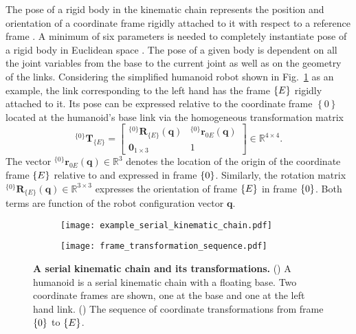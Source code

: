 The pose of a rigid body in the kinematic chain represents the position and orientation of a coordinate frame rigidly attached to it with respect to a reference frame \cite{Siciliano2008RoboticsModellingPlanning}. A minimum of six parameters is needed to completely instantiate pose of a rigid body in Euclidean space \cite{Lynch2017Modernrobotics}. The pose of a given body is dependent on all the joint variables from the base to the current joint as well as on the geometry of the links. Considering the simplified humanoid robot shown in Fig.~\ref{fig:example_serial_kinematic_chain} as an example, the link corresponding to the left hand has the frame ${\left\lbrace E \right\rbrace}$ rigidly attached to it. Its pose can be expressed relative to the coordinate frame $\left\lbrace 0 \right\rbrace$ located at the humanoid's base link via the homogeneous transformation matrix%
\begin{equation}
	^{\{0\}}\bm{T}_{\{E\}} = \begin{bmatrix}
		^{\{0\}}\bm{R}_{\{E\}}(\bm{q}) & ^{\{0\}}\bm{r}_{0E}(\bm{q}) \\
		\bm{0}_{1\times3} & 1
	\end{bmatrix} \in \mathbb{R}^{4\times 4}.
\end{equation}
The vector $^{\{0\}}\bm{r}_{0E}(\bm{q}) \in \mathbb{R}^3$ denotes the location of the origin of the coordinate frame ${\left\lbrace E \right\rbrace}$ relative to and expressed in frame ${\left\lbrace 0 \right\rbrace}$. Similarly, the rotation matrix $^{\{0\}}\bm{R}_{\{E\}}(\bm{q})  \in \mathbb{R}^{3\times 3}$ expresses the orientation of frame ${\left\lbrace E \right\rbrace}$ in frame ${\left\lbrace 0 \right\rbrace}$. Both terms are function of the robot configuration vector $\bm{q}$.

\begin{figure*}[!t]
	\centering	
	\hspace*{\fill}
	\begin{subfigure}[t]{0.40\textwidth}
		\subcaption{}
		\texttt{[image: example\_serial\_kinematic\_chain.pdf]}
		\label{fig:example_serial_kinematic_chain}
	\end{subfigure}	
	\hfill
	\begin{subfigure}[t]{0.40\textwidth}
		\subcaption{}
		\texttt{[image: frame\_transformation\_sequence.pdf]}
		\label{fig:transformation_sequence}
	\end{subfigure}	
	\hspace*{\fill}
	\caption{\label{fig:serial_kinematic_chain} \textbf{A serial kinematic chain and its transformations.} ()  A humanoid is a serial kinematic chain with a floating base. Two coordinate frames are shown, one at the base and one at the left hand link. () The sequence of coordinate transformations from frame ${\left\lbrace 0 \right\rbrace}$ to ${\left\lbrace E \right\rbrace}$.}
\end{figure*}

